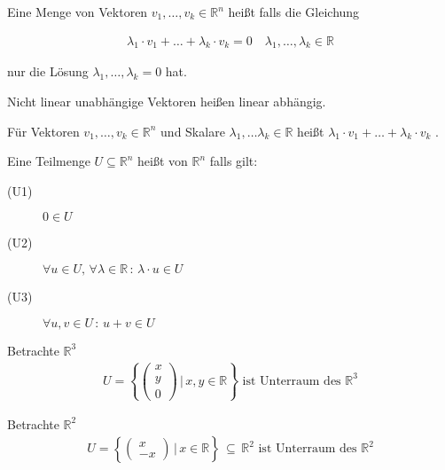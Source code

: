Eine Menge von Vektoren $v_1,\dots,v_k \in \mathbb{R}^n$ heißt  falls die Gleichung

\begin{align*}
	\lambda _1 \cdot v_1 +\dots+\lambda _k \cdot v_k = 0\quad \lambda _1,\dots,\lambda _k \in \mathbb{R}
\end{align*}

nur die Lösung $\lambda _1,\dots,\lambda _k = 0$ hat.

Nicht linear unabhängige Vektoren heißen linear abhängig.

Für Vektoren $v_1,\dots,v_k \in \mathbb{R}^n$ und Skalare $\lambda _1,\dots\lambda _k \in \mathbb{R}$ heißt $\lambda _1 \cdot v_1+\dots+\lambda _k \cdot v_k$ .

Eine Teilmenge $U \subseteq \mathbb{R}^n$ heißt  von $\mathbb{R}^n$ falls gilt:
\begin{description}
	\item[(U1)]{$0 \in U$}
	\item[(U2)]{$\forall u \in U,\, \forall \lambda \in \mathbb{R}\,:\,\lambda \cdot u \in U$}
	\item[(U3)]{$\forall u,v \in U\,:\,u+v \in U$}
\end{description}

Betrachte $\mathbb{R}^3$
\begin{align*}
	U = \left\{\begin{pmatrix}x \\ y \\ 0\end{pmatrix}\,\Bigg|\,x,y \in \mathbb{R}\right\}\text{ ist Unterraum des }\mathbb{R}^3
\end{align*}

Betrachte $\mathbb{R}^2$
\begin{align*}
	U = \left\{\begin{pmatrix}x \\ -x\end{pmatrix}\,\Bigg|\,x \in \mathbb{R}\right\}\,\subseteq\,\mathbb{R}^2\text{ ist Unterraum des }\mathbb{R}^2
\end{align*}

\begin{center}
\end{center}

